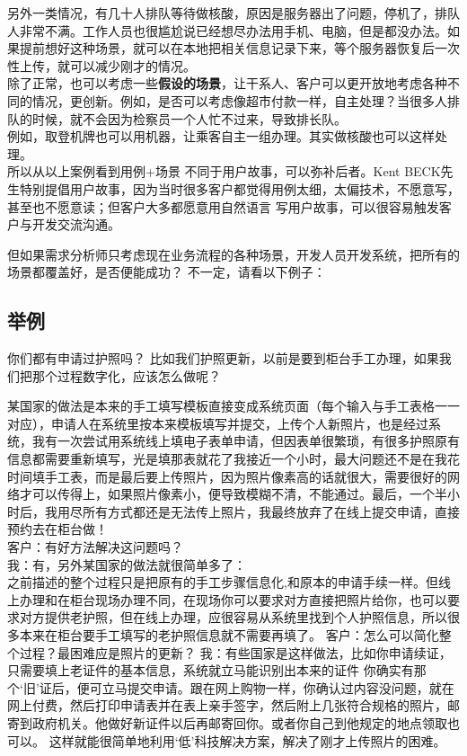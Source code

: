 另外一类情况，有几十人排队等待做核酸，原因是服务器出了问题，停机了，排队人非常不满。工作人员也很尴尬说已经想尽办法用手机、电脑，但是都没办法。如果提前想好这种场景，就可以在本地把相关信息记录下来，等个服务器恢复后一次性上传，就可以减少刚才的情况。\\

除了正常，也可以考虑一些\textbf{假设的场景}，让干系人、客户可以更开放地考虑各种不同的情况，更创新。例如，是否可以考虑像超市付款一样，自主处理？当很多人排队的时候，就不会因为检察员一个人忙不过来，导致排长队。\\
例如，取登机牌也可以用机器，让乘客自主一组办理。其实做核酸也可以这样处理。\\
所以从以上案例看到用例+场景 不同于用户故事，可以弥补后者。Kent
BECK先生特别提倡用户故事，因为当时很多客户都觉得用例太细，太偏技术，不愿意写，甚至也不愿意读；但客户大多都愿意用自然语言
写用户故事，可以很容易触发客户与开发交流沟通。

但如果需求分析师只考虑现在业务流程的各种场景，开发人员开发系统，把所有的场景都覆盖好，是否便能成功？
不一定，请看以下例子：

\hypertarget{ux4e3eux4f8b}{%
\subsection{举例}\label{ux4e3eux4f8b}}

你们都有申请过护照吗？
比如我们护照更新，以前是要到柜台手工办理，如果我们把那个过程数字化，应该怎么做呢？

某国家的做法是本来的手工填写模板直接变成系统页面（每个输入与手工表格一一对应），申请人在系统里按本来模板填写并提交，上传个人新照片，也是经过系统，我有一次尝试用系统线上填电子表单申请，但因表单很繁琐，有很多护照原有信息都需要重新填写，光是填那表就花了我接近一个小时，最大问题还不是在我花时间填手工表，而是最后要上传照片，因为照片像素高的话就很大，需要很好的网络才可以传得上，如果照片像素小，便导致模糊不清，不能通过。最后，一个半小时后，我用尽所有方式都还是无法传上照片，我最终放弃了在线上提交申请，直接预约去在柜台做！\\
客户：有好方法解决这问题吗？\\
我：有，另外某国家的做法就很简单多了：\\
之前描述的整个过程只是把原有的手工步骤信息化,和原本的申请手续一样。但线上办理和在柜台现场办理不同，在现场你可以要求对方直接把照片给你，也可以要求对方提供老护照，但在线上办理，应很容易从系统里找到个人护照信息，所以很多本来在柜台要手工填写的老护照信息就不需要再填了。
客户：怎么可以简化整个过程？最困难应是照片的更新？
我：有些国家是这样做法，比如你申请续证，只需要填上老证件的基本信息，系统就立马能识别出本来的证件
你确实有那个`旧'证后，便可立马提交申请。跟在网上购物一样，你确认过内容没问题，就在网上付费，然后打印申请表并在表上亲手签字，然后附上几张符合规格的照片，邮寄到政府机关。他做好新证件以后再邮寄回你。或者你自己到他规定的地点领取也可以。
这样就能很简单地利用`低'科技解决方案，解决了刚才上传照片的困难。

